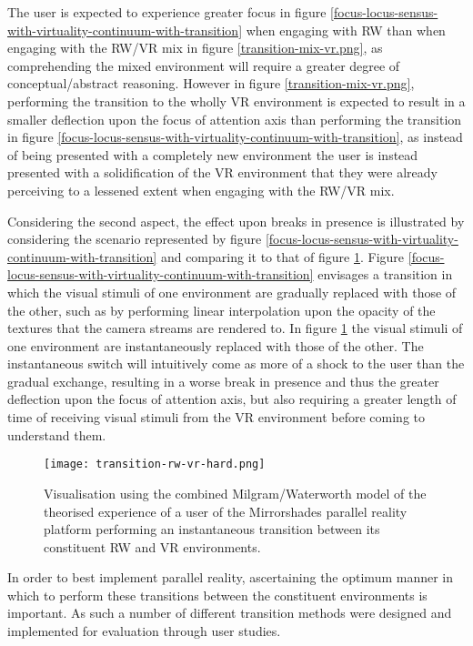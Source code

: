 The user is expected to experience greater focus in figure \ref{focus-locus-sensus-with-virtuality-continuum-with-transition} when engaging with RW than when engaging with the RW/VR mix in figure \ref{transition-mix-vr.png}, as comprehending the mixed environment will require a greater degree of conceptual/abstract reasoning. However in figure \ref{transition-mix-vr.png}, performing the transition to the wholly VR environment is expected to result in a smaller deflection upon the focus of attention axis than performing the transition in figure \ref{focus-locus-sensus-with-virtuality-continuum-with-transition}, as instead of being presented with a completely new environment the user is instead presented with a solidification of the VR environment that they were already perceiving to a lessened extent when engaging with the RW/VR mix.

Considering the second aspect, the effect upon breaks in presence is illustrated by considering the scenario represented by figure \ref{focus-locus-sensus-with-virtuality-continuum-with-transition} and comparing it to that of figure \ref{transition-rw-vr-hard.png}. Figure \ref{focus-locus-sensus-with-virtuality-continuum-with-transition} envisages a transition in which the visual stimuli of one environment are gradually replaced with those of the other, such as by performing linear interpolation upon the opacity of the textures that the camera streams are rendered to. In figure \ref{transition-rw-vr-hard.png} the visual stimuli of one environment are instantaneously replaced with those of the other. The instantaneous switch will intuitively come as more of a shock to the user than the gradual exchange, resulting in a worse break in presence and thus the greater deflection upon the focus of attention axis, but also requiring a greater length of time of receiving visual stimuli from the VR environment before coming to understand them.

\begin{figure}[h]
	\begin{center}
		\texttt{[image: transition-rw-vr-hard.png]}
		\caption{Visualisation using the combined Milgram/Waterworth model of the theorised experience of a user of the Mirrorshades parallel reality platform performing an instantaneous transition between its constituent RW and VR environments.}
		\label{transition-rw-vr-hard.png}
	\end{center}
\end{figure}

In order to best implement parallel reality, ascertaining the optimum manner in which to perform these transitions between the constituent environments is important. As such a number of different transition methods were designed and implemented for evaluation through user studies.

